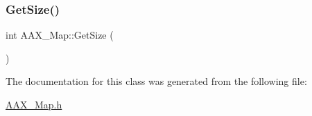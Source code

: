 \mbox{\label{a01981_a51dd6cb01b5b743536765d559907de28}} 
\subsubsection{\texorpdfstring{GetSize()}{GetSize()}}
{\footnotesize\ttfamily int A\+A\+X\+\_\+\+Map\+::\+Get\+Size (\begin{DoxyParamCaption}{ }\end{DoxyParamCaption})\hspace{0.3cm}{\ttfamily [inline]}}



The documentation for this class was generated from the following file\+:\begin{DoxyCompactItemize}
\item 
\mbox{\hyperlink{a00767}{A\+A\+X\+\_\+\+Map.\+h}}\end{DoxyCompactItemize}
